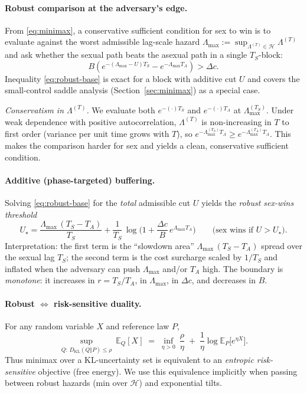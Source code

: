 \documentclass[11pt]{article}
\theoremstyle{upright}
\newcommand{\E}{\mathbb{E}}
\newcommand{\horizon}{\Lambda}
\newcommand{\Lmax}{\horizon^{(T)}_{\max}}
\newcommand{\Hset}{\mathcal{H}}
\newcommand{\hazT}[1]{\Lambda^{(#1)}}          %
\renewcommand{\Lmax}{\Lambda_{\max}}
\begin{document}
\paragraph{Robust comparison at the adversary’s edge.}
From \eqref{eq:minimax}, a conservative sufficient condition for sex to win is to evaluate against the worst admissible lag-scale hazard $\Lmax:=\sup_{\hazT{T}\in\Hset}\hazT{T}$ and ask whether the sexual path beats the asexual path in a single $T_S$-block:
\begin{equation}
\label{eq:robust-base}
B\left(e^{-(\Lmax-U)T_S}-e^{-\Lmax T_A}\right)>\Delta c.
\end{equation}
Inequality \eqref{eq:robust-base} is exact for a block with additive cut $U$ and covers the small-control saddle analysis (Section~\ref{sec:minimax}) as a special case.

\noindent\emph{Conservatism in $\hazT{T}$.}
We evaluate both $e^{-(\cdot)T_S}$ and $e^{-(\cdot)T_A}$ at $\Lambda^{(T_S)}_{\max}$.
Under weak dependence with positive autocorrelation, $\hazT{T}$ is non-increasing in $T$ to first order
(variance per unit time grows with $T$), so
$e^{-\Lambda^{(T_S)}_{\max} T_A}\ge e^{-\Lambda^{(T_A)}_{\max} T_A}$.
This makes the comparison harder for sex and yields a clean, conservative sufficient condition.

\paragraph{Additive (phase-targeted) buffering.}
Solving \eqref{eq:robust-base} for the \emph{total} admissible cut $U$ yields the \emph{robust sex-wins threshold}
\begin{equation}
\label{eq:robust-U}
\boxed{
U_\star = \frac{\Lmax\,(T_S-T_A)}{T_S}
+ \frac{1}{T_S}\,\log\!\Big(1+\frac{\Delta c}{B}\,e^{\Lmax T_A}\Big)
}\qquad\text{(sex wins if $U>U_\star$).}
\end{equation}
Interpretation: the first term is the “slowdown area” $\Lmax\,(T_S-T_A)$ spread over the sexual lag $T_S$; the second term is the cost surcharge scaled by $1/T_S$ and inflated when the adversary can push $\Lmax$ and/or $T_A$ high. The boundary is \emph{monotone}: it increases in $r=T_S/T_A$, in $\Lmax$, in $\Delta c$, and decreases in $B$.

\paragraph{Robust $\Leftrightarrow$ risk-sensitive duality.}
For any random variable $X$ and reference law $P$,
\begin{equation}\label{eq:entropic-dual}
\sup_{Q:\,D_{\mathrm{KL}}(Q\Vert P)\le \rho}\ \E_Q[X]
\;=\;
\inf_{\eta>0}\ \frac{\rho}{\eta}\;+\;\frac{1}{\eta}\log \E_P\!\big[e^{\eta X}\big].
\end{equation}
Thus minimax over a KL-uncertainty set is equivalent to an \emph{entropic risk-sensitive} objective (free energy).
We use this equivalence implicitly when passing between robust hazards (min over $\Hset$) and exponential tilts.
\end{document}

